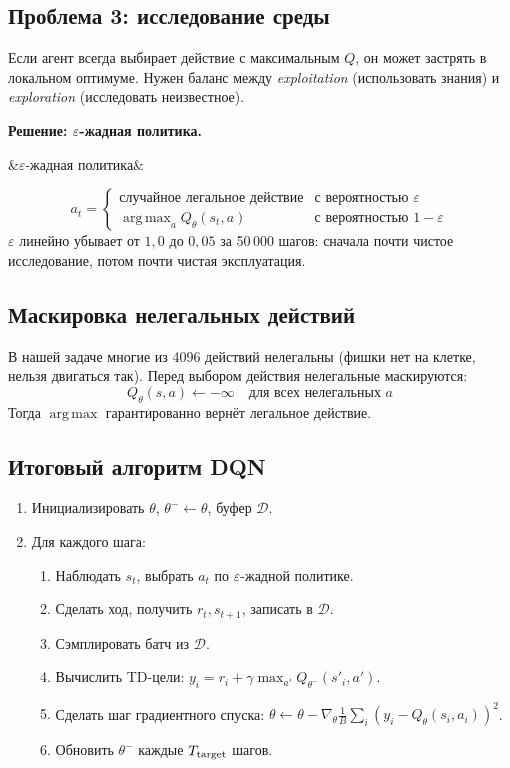 \documentclass[a4paper, 11pt]{article}
\newenvironment{defbox}[1][]{%
  \begin{mdframed}[style=defstyle]
  \ifx&#1&\else{\bfseries\color{defblue}#1.}\quad\fi\ignorespaces
}{%
  \end{mdframed}
}
\DeclareMathOperator*{\argmax}{arg\,max}
\begin{document}
\subsection{Проблема 3: исследование среды}

Если агент всегда выбирает действие с максимальным $Q$, он может
застрять в локальном оптимуме. Нужен баланс между \emph{exploitation}
(использовать знания) и \emph{exploration} (исследовать неизвестное).

\textbf{Решение: $\varepsilon$-жадная политика.}

\begin{defbox}[$\varepsilon$-жадная политика]
\[
  a_t = \begin{cases}
    \text{случайное легальное действие} & \text{с вероятностью } \varepsilon \\
    \argmax_{a} Q_\theta(s_t, a)       & \text{с вероятностью } 1 - \varepsilon
  \end{cases}
\]
$\varepsilon$ линейно убывает от $1{,}0$ до $0{,}05$ за 50\,000 шагов:
сначала почти чистое исследование, потом почти чистая эксплуатация.
\end{defbox}

\subsection{Маскировка нелегальных действий}

В нашей задаче многие из 4096 действий нелегальны (фишки нет на клетке,
нельзя двигаться так). Перед выбором действия нелегальные маскируются:
\[
  Q_\theta(s, a) \leftarrow -\infty \quad \text{для всех нелегальных } a
\]
Тогда $\argmax$ гарантированно вернёт легальное действие.

\subsection{Итоговый алгоритм DQN}

\begin{enumerate}[itemsep=3pt]
  \item Инициализировать $\theta$, $\theta^- \leftarrow \theta$, буфер $\mathcal{D}$.
  \item Для каждого шага:
    \begin{enumerate}[itemsep=2pt]
      \item Наблюдать $s_t$, выбрать $a_t$ по $\varepsilon$-жадной политике.
      \item Сделать ход, получить $r_t, s_{t+1}$, записать в $\mathcal{D}$.
      \item Сэмплировать батч из $\mathcal{D}$.
      \item Вычислить TD-цели: $y_i = r_i + \gamma \max_{a'} Q_{\theta^-}(s'_i, a')$.
      \item Сделать шаг градиентного спуска: $\theta \leftarrow \theta -
            \nabla_\theta \frac{1}{B}\sum_i (y_i - Q_\theta(s_i, a_i))^2$.
      \item Обновить $\theta^-$ каждые $T_{\rm target}$ шагов.
    \end{enumerate}
\end{enumerate}
\end{document}
